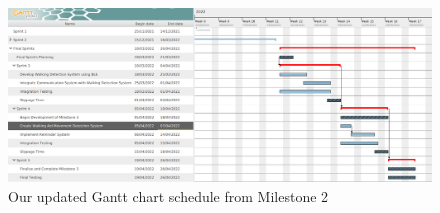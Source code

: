 \begin{figure}[H]
	\centering
	\captionsetup{width=1.0\linewidth}


	\includegraphics[width=1.0\linewidth]{graphics/ganttm2.png}

	\caption[Milestone 2 Gantt Chart]{Our updated Gantt chart schedule from Milestone 2 \cite{mile2}}

	\label{fig:ganttm2-2}

\end{figure}